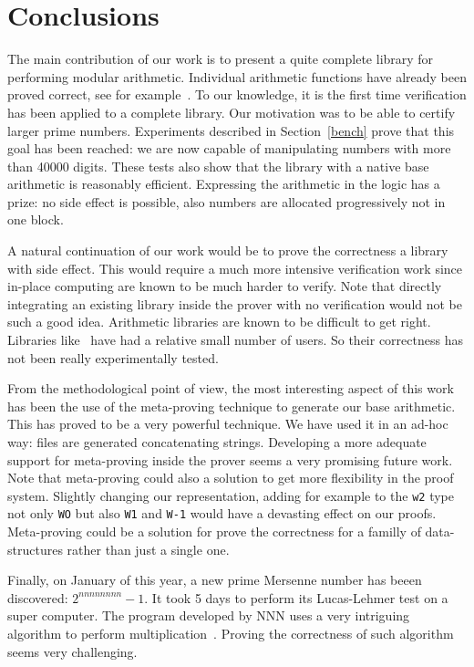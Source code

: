 \section{Conclusions}

The main contribution of our work is to present a quite complete library for performing
modular arithmetic. Individual arithmetic functions have already been proved correct,
see for example~\cite{BerMagZim02}. To our knowledge, it is the first time verification
has been applied to a complete library.
Our motivation was to be able to certify 
larger prime numbers. Experiments described in Section~\ref{bench}  prove that
this goal has been reached: we are now capable of manipulating numbers with more than 40000 digits.
These tests also show that the library with a native base arithmetic is
reasonably efficient. Expressing the arithmetic in the logic has a prize: no side effect is possible, 
also numbers are allocated progressively not in one block.

A natural continuation of our work would be to prove the correctness a library with side effect.
This would require a much more intensive verification work since in-place computing
are known to be much harder to verify.
Note that directly integrating an existing library inside the prover with no verification
would not be such a good idea.
Arithmetic libraries are known to be difficult to get right. Libraries like~\cite{bignum}
have had a relative small number of users. So their correctness has not
been really experimentally tested.

From the methodological point of view, the most interesting aspect of this work
has been the use of the meta-proving technique to generate our base arithmetic. This has proved
to be a very powerful technique. We have used it in an ad-hoc way: files are generated concatenating
strings. Developing a more adequate support for meta-proving inside the prover seems a
very promising future work. Note that meta-proving could also a solution to get more flexibility
in the proof system. Slightly changing our representation, adding for example to  the {\tt w2} type not only {\tt WO}
but also {\tt W1} and {\tt W-1} would have a devasting effect on our proofs.
Meta-proving could be a solution for prove the correctness for a familly of data-structures rather than
just a single one.

Finally, on January of this year, a new prime Mersenne number has beeen discovered: $2 ^{nnnnnnnn} - 1$.
It took 5 days to  perform its Lucas-Lehmer test on a super computer. The program developed by NNN
uses a very intriguing algorithm to perform multiplication~\cite{crandall}. Proving the correctness of such algorithm
seems very challenging. 